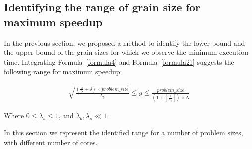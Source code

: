 \vspace{\baselineskip}
\subsection{Identifying the range of grain size for maximum speedup}
In the previous section, we proposed a method to identify the lower-bound and the upper-bound of the grain sizes for which we observe the minimum execution time. 
Integrating Formula~\ref{formula4} and Formula~\ref{formula21} suggests the following range for maximum speedup:


\begin{equation}\label{formula23}
\begin{aligned}
{\sqrt{\frac{(\frac{\alpha}{N}+\delta)\times{problem\_{size}}}{{\lambda_b}}}}\leq{g}\leq\frac{problem\_{size}}{(1+\left\lceil{\frac{1}{\lambda_s}}\right\rceil)\times{N}}
\end{aligned}
\end{equation}
 
Where $0\leq\lambda_s\leq1$, and $\lambda_b,\lambda_s\ll1$.

In this section we represent the identified range for a number of problem sizes, with different number of cores.





\vspace{\baselineskip}
%




